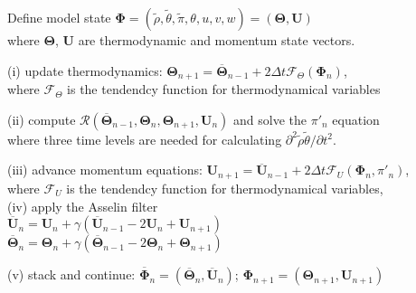 \documentclass[a4paper,11pt]{article}
\begin{document}
\begin{algorithm}
\begin{tcolorbox}[parbox=false, width=38em]

    Define model state $\mathbf{\Phi} = (\tilde{\rho},\tilde{\theta},\tilde{\pi},\theta,u,v,w) = (\mathbf{\Theta}, \mathbf{U})$\\[-1ex]         
    \qquad where $\mathbf{\Theta}$, $\mathbf{U}$ are thermodynamic and momentum state vectors.\\
    
     {
        (i) update thermodynamics: $\mathbf{\Theta}_{n+1} = \overline{\mathbf{\Theta}}_{n-1} + 2\Delta t \mathcal{F}_{\Theta}(\mathbf{\Phi}_n)$,\\[-1ex]
        \qquad where $\mathcal{F}_{\Theta}$ is the tendendcy function for thermodynamical variables%
        
        (ii) compute $\mathcal{R}(\overline{\mathbf{\Theta}}_{n-1}, \mathbf{\Theta}_{n}, \mathbf{\Theta}_{n+1}, \mathbf{U}_n)$ and solve the $\pi'_{n}$ equation\\[-1ex]
        \qquad where three time levels are needed for calculating $\partial^2\tilde{\rho}\tilde{\theta}/\partial t^2$. 
        
        (iii) advance momentum equations: $\mathbf{U}_{n+1} = \overline{\mathbf{U}}_{n-1} + 2\Delta t \mathcal{F}_{U}(\mathbf{\Phi}_n, \pi'_n)$,\\[-1ex]
        \qquad  where $\mathcal{F}_{U}$ is the tendendcy function for thermodynamical variables,\\[-1ex]
        
        (iv) apply the Asselin filter\\[-1ex] 
\qquad $\overline{\mathbf{U}}_n = \mathbf{U}_n + \gamma (\overline{\mathbf{U}}_{n-1} - 2\mathbf{U}_n + \mathbf{U}_{n+1})$\\[-1ex]    
\qquad $\overline{\mathbf{\Theta}}_n = \mathbf{\Theta}_n + \gamma (\overline{\mathbf{\Theta}}_{n-1} - 2\mathbf{\Theta}_n + \mathbf{\Theta}_{n+1})$        

        (v) stack and continue: $\overline{\mathbf{\Phi}}_n = (\overline{\mathbf{\Theta}}_n, \overline{\mathbf{U}}_n)$; $\mathbf{\Phi}_{n+1} = (\mathbf{\Theta}_{n+1}, \mathbf{U}_{n+1})$
        }        
\end{tcolorbox}    
\end{algorithm}
\end{document}

